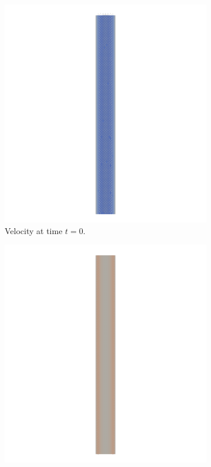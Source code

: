 \documentclass[a4paper,11pt,oneside]{book}
\begin{document}
\newpage

\begin{figure}[h!] 
  \begin{subfigure}[b]{0.5\linewidth}
    \centering
    \includegraphics[width=1.2\linewidth]{images/velocity_fixed_0.png} 
        \centering
    \caption{Velocity at time $t = 0$.} 
    \label{fig1:a} 
    \vspace{4ex}
  \end{subfigure}%
  \begin{subfigure}[b]{0.5\linewidth}
    \centering
    \includegraphics[width=1.2\linewidth]{images/velocity_fixed_025.png}

\end{subfigure}
\end{figure}
\end{document}
